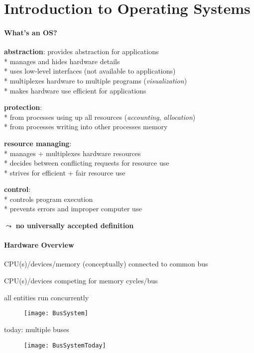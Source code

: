 \section{Introduction to Operating Systems}

\paragraph{What's an OS?}
\begin{items}
	\item \textbf{abstraction}: provides abstraction for applications \\*
		manages and hides hardware details \\*
		uses low-level interfaces (not available to applications) \\*
		multiplexes hardware to multiple programs (\emph{visualization}) \\*
		makes hardware use efficient for applications
	\item \textbf{protection}: \\*
		from processes using up all resources (\emph{accounting}, \emph{allocation}) \\*
		from processes writing into other processes memory
	\item \textbf{resource managing}: \\*
		manages + multiplexes hardware resources \\*
		decides between conflicting requests for resource use \\*
		strives for efficient + fair resource use
	\item \textbf{control}: \\*
		controls program execution \\*
		prevents errors and improper computer use
	\item \( \leadsto \) \textbf{no universally accepted definition}
\end{items}

\paragraph{Hardware Overview}
\begin{items}
	\item CPU(s)/devices/memory (conceptually) connected to common bus
	\item CPU(s)/devices competing for memory cycles/bus
	\item all entities run concurrently
	\begin{figure}[H]\centering\label{BusSystem}\texttt{[image: BusSystem]}\end{figure}
	\item today: multiple buses
	\begin{figure}[H]\centering\label{BusSystemToday}\texttt{[image: BusSystemToday]}\end{figure}
\end{items}

